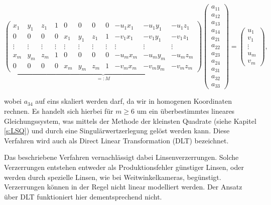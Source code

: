  \setcounter{MaxMatrixCols}{20}
\begin{equation}\label{eq:DLT}
\underbrace{\begin{pmatrix}
x_1 & y_1 & z_1 & 1 & 0 & 0 & 0 & 0 & -u_1 x_1 & -u_1 y_1 & -u_1z_1 \\
0 & 0 & 0 & 0 & x_1 & y_1 & z_1 & 1 & -v_1x_1 & -v_1y_1 & -v_1z_1 \\
\vdots & \vdots & \vdots & \vdots & \vdots & \vdots & \vdots & \vdots & \vdots & \vdots & \vdots\\
x_m & y_m & z_m & 1 & 0 & 0 & 0 & 0 & -u_m x_m & -u_m y_m & -u_m z_m \\
0 & 0 & 0 & 0 & x_m & y_m & z_m & 1 & -v_mx_m & -v_my_m & -v_mz_m
\end{pmatrix}}_{=:M}
\begin{pmatrix}
a_{11} \\ a_{12} \\ a_{13} \\ a_{14} \\ a_{21} \\ a_{22} \\ a_{23} \\ a_{24} \\ a_{31} \\ a_{32} \\ a_{33}
\end{pmatrix} = 
\begin{pmatrix}
u_1 \\ v_1 \\ \vdots \\ u_m \\ v_m
\end{pmatrix},
\end{equation}

wobei $a_{34}$ auf eins skaliert werden darf, da wir in homogenen Koordinaten rechnen. Es handelt sich hierbei für $m \geq 6$ um ein überbestimmtes lineares Gleichungssystem, was mittels der Methode der kleinsten Quadrate (siehe Kapitel \ref{s:LSQ}) und durch eine Singulärwertzerlegung gelöst werden kann. 
Diese Verfahren wird auch als Direct Linear Transformation (DLT) bezeichnet.
 
Das beschriebene Verfahren vernachlässigt dabei Linsenverzerrungen. Solche Verzerrungen entstehen entweder als Produktionsfehler günstiger Linsen, oder werden durch spezielle Linsen, wie bei Weitwinkelkameras, begünstigt.  Verzerrungen können in der Regel nicht linear modelliert werden. Der Ansatz über DLT funktioniert hier dementsprechend nicht. 

